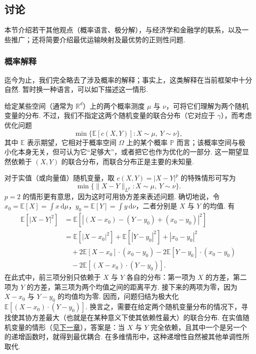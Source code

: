 \subsection{讨论}\label{sec:1.7}
\setcounter{theorem}{52}
\setcounter{boxcounter}{13}
\setcounter{equation}{6}
\setcounter{footnote}{12}

本节介绍若干其他观点（概率语言、极分解），与经济学和金融学的联系，以及一些推广；还将简要介绍最优运输映射及最优势的正则性问题.

\subsubsection{概率解释}\label{sec:1.7.1}

迄今为止，我们完全略去了涉及概率的解释；事实上，这类解释在当前框架中十分自然. 暂时换一种语言，可以如下描述这一情形.

给定某些空间（通常为 $\mathbb R^d$）上的两个概率测度 $\mu$ 与 $\nu$，可将它们理解为两个随机变量的分布. 不过，我们不指定这两个随机变量的联合分布（它对应于 $\gamma$），而考虑优化问题
\[
 \min\bigl\{\mathbb E[c(X,Y)]:X\sim\mu,\ Y\sim\nu\bigr\},
\]
其中 $\mathbb E$ 表示期望，它相对于概率空间 $\Omega$ 上的某个概率 $\mathbb P$ 而言；该概率空间与极小化本身无关，但可认为它“足够大”，或者把它也作为优化的一部分. 这一期望显然依赖于 $(X,Y)$ 的联合分布，而联合分布正是主要的未知量.

对于实值（或向量值）随机变量，取 $c(X,Y)=|X-Y|^p$ 的特殊情形可写为
\[
 \min\bigl\{\|X-Y\|_{L^p}:X\sim\mu,\ Y\sim\nu\bigr\}.
\]
$p=2$ 的情形更有意思，因为这时可用协方差来表述问题. 确切地说，令 $x_0=\mathbb E[X]=\int x\,\mathrm d\mu$，$y_0=\mathbb E[Y]=\int y\,\mathrm d\nu$，二者分别是 $X$ 与 $Y$ 的均值. 有
\begin{equation*}
\begin{aligned}
 \mathbb E[|X-Y|^2]
 &=\mathbb E[|(X-x_0)-(Y-y_0)+(x_0-y_0)|^2]\\
 &=\mathbb E[|X-x_0|^2]+\mathbb E[|Y-y_0|^2]+|x_0-y_0|^2\\
 &\quad+2\mathbb E[X-x_0]\cdot(x_0-y_0)
       -2\mathbb E[Y-y_0]\cdot(x_0-y_0)\\
 &\quad-2\mathbb E[(X-x_0)\cdot(Y-y_0)].
\end{aligned}
\end{equation*}
在此式中，前三项分别只依赖于 $X$ 与 $Y$ 各自的分布：第一项为 $X$ 的方差，第二项为 $Y$ 的方差，第三项为两个均值之间的距离平方. 接下来的两项为零，因为 $X-x_0$ 与 $Y-y_0$ 的均值均为零. 因而，问题归结为极大化 $\mathbb E[(X-x_0)\cdot(Y-y_0)]$. 换言之，需要在给定两个随机变量分布的情况下，寻找使其协方差最大（也就是在某种意义下使其依赖性最大）的联合分布. 在实值随机变量的情形（见\hyperref[sec:2]{下一章}），答案是：当 $X$ 与 $Y$ 完全依赖，且其中一个是另一个的递增函数时，就得到最优耦合. 在多维情形中，这种递增性自然被其他单调性所取代.

